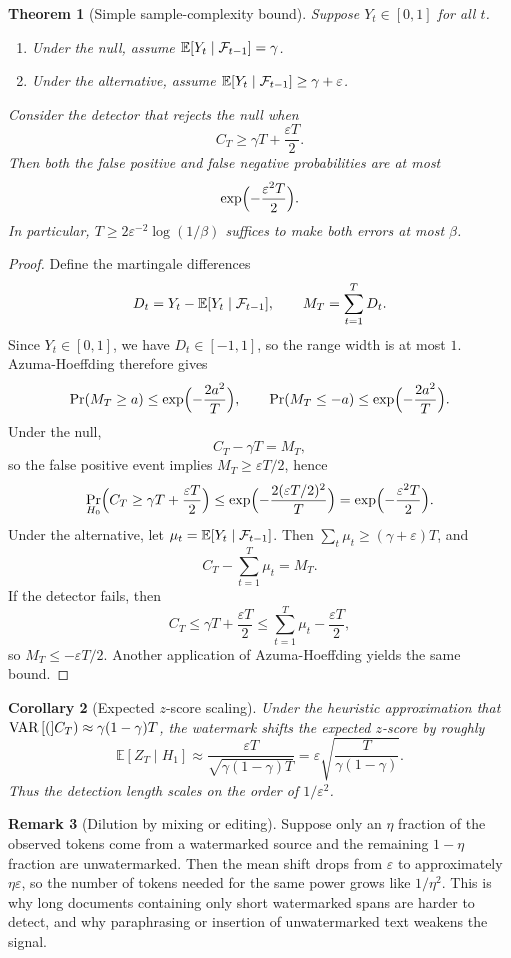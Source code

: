 \documentclass[11pt]{article}
\newtheorem{theorem}{Theorem}[section]
\newtheorem{corollary}[theorem]{Corollary}
\theoremstyle{definition}
\newtheorem{remark}[theorem]{Remark}
\newcommand{\PrK}{\Pr}
\newcommand{\E}{\mathbb{E}}
\newcommand{\1}{\mathbf{1}}
\begin{document}
\begin{theorem}[Simple sample-complexity bound]
Suppose $Y_t \in [0,1]$ for all $t$.
\begin{enumerate}
    \item Under the null, assume $\E[Y_t\mid \cF_{t-1}] = \gamma$.
    \item Under the alternative, assume $\E[Y_t\mid \cF_{t-1}] \ge \gamma+\varepsilon$.
\end{enumerate}
Consider the detector that rejects the null when
\[
C_T \ge \gamma T + \frac{\varepsilon T}{2}.
\]
Then both the false positive and false negative probabilities are at most
\[
\exp\Bigl(-\frac{\varepsilon^2 T}{2}\Bigr).
\]
In particular, $T \ge 2\varepsilon^{-2}\log(1/\beta)$ suffices to make both errors at most $\beta$.
\end{theorem}

\begin{proof}
Define the martingale differences
\[
D_t = Y_t - \E[Y_t\mid \cF_{t-1}], \qquad M_T = \sum_{t=1}^T D_t.
\]
Since $Y_t\in[0,1]$, we have $D_t\in[-1,1]$, so the range width is at most $1$. Azuma-Hoeffding therefore gives
\[
\PrK(M_T \ge a) \le \exp\Bigl(-\frac{2a^2}{T}\Bigr),
\qquad
\PrK(M_T \le -a) \le \exp\Bigl(-\frac{2a^2}{T}\Bigr).
\]
Under the null,
\[
C_T-\gamma T = M_T,
\]
so the false positive event implies $M_T\ge \varepsilon T/2$, hence
\[
\PrK_{H_0}\Bigl(C_T \ge \gamma T + \frac{\varepsilon T}{2}\Bigr)
\le \exp\Bigl(-\frac{2(\varepsilon T/2)^2}{T}\Bigr)
= \exp\Bigl(-\frac{\varepsilon^2T}{2}\Bigr).
\]
Under the alternative, let $\mu_t=\E[Y_t\mid \cF_{t-1}]$. Then $\sum_t \mu_t \ge (\gamma+\varepsilon)T$, and
\[
C_T - \sum_{t=1}^T \mu_t = M_T.
\]
If the detector fails, then
\[
C_T \le \gamma T + \frac{\varepsilon T}{2}
\le \sum_{t=1}^T \mu_t - \frac{\varepsilon T}{2},
\]
so $M_T \le -\varepsilon T/2$. Another application of Azuma-Hoeffding yields the same bound.
\end{proof}

\begin{corollary}[Expected $z$-score scaling]
Under the heuristic approximation that $\Var(C_T) \approx \gamma(1-\gamma)T$, the watermark shifts the expected $z$-score by roughly
\[
\E[Z_T \mid H_1] \approx \frac{\varepsilon T}{\sqrt{\gamma(1-\gamma)T}}
= \varepsilon\sqrt{\frac{T}{\gamma(1-\gamma)}}.
\]
Thus the detection length scales on the order of $1/\varepsilon^2$.
\end{corollary}

\begin{remark}[Dilution by mixing or editing]
Suppose only an $\eta$ fraction of the observed tokens come from a watermarked source and the remaining $1-\eta$ fraction are unwatermarked. Then the mean shift drops from $\varepsilon$ to approximately $\eta\varepsilon$, so the number of tokens needed for the same power grows like $1/\eta^2$. This is why long documents containing only short watermarked spans are harder to detect, and why paraphrasing or insertion of unwatermarked text weakens the signal.
\end{remark}
\end{document}
